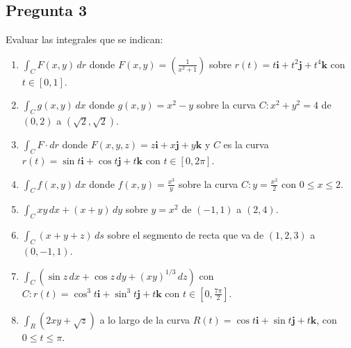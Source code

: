 \documentclass{article}
\begin{document}
\subsection*{Pregunta 3}
Evaluar las integrales que se indican:
\begin{enumerate}
    \item \( \int_{C} F(x,y) \, dr \) donde \( F(x,y) = \left(\frac{1}{x^2 + 1}\right) \) sobre \( r(t) = t\mathbf{i} + t^2\mathbf{j} + t^4\mathbf{k} \) con \( t \in [0,1] \).
    \item \( \int_{C} g(x,y) \, dx \) donde \( g(x, y) = x^2 - y \) sobre la curva \( C: x^2 + y^2 = 4 \) de \( (0, 2) \) a \( (\sqrt{2}, \sqrt{2}) \).
    \item \( \int_{C} F \cdot dr \) donde \( F(x, y, z) = z\mathbf{i} + x\mathbf{j} + y\mathbf{k} \) y \( C \) es la curva \( r(t) = \sin t \mathbf{i} + \cos t \mathbf{j} + t \mathbf{k} \) con \( t \in [0, 2\pi] \).
    \item \( \int_{C} f(x, y) \, dx \) donde \( f(x, y) = \frac{x^3}{y} \) sobre la curva \( C: y = \frac{x^2}{2} \) con \( 0 \leq x \leq 2 \).
    \item \( \int_{C} xy \, dx + (x + y) \, dy \) sobre \( y = x^2 \) de \( (-1, 1) \) a \( (2, 4) \).
    \item \( \int_{C} (x + y + z) \, ds \) sobre el segmento de recta que va de \( (1, 2, 3) \) a \( (0, -1, 1) \).
    \item \( \int_{C} (\sin z \, dx + \cos z \, dy + (xy)^{1/3} \, dz) \) con \( C: r(t) = \cos^3 t \mathbf{i} + \sin^3 t \mathbf{j} + t \mathbf{k} \) con \( t \in [0, \frac{7\pi}{2}] \).
    \item \( \int_{R} (2xy + \sqrt{z}) \) a lo largo de la curva \( R(t) = \cos t \mathbf{i} + \sin t \mathbf{j} + t \mathbf{k} \), con \( 0 \leq t \leq \pi \).
\end{enumerate}
\end{document}
